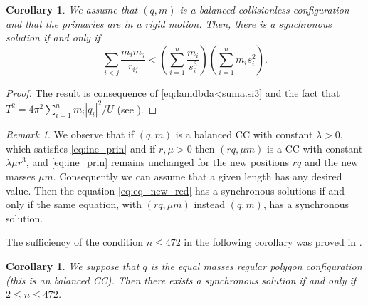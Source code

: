 \documentclass[twoside]{article}
\newtheorem{cor}[thm]{Corollary}
\theoremstyle{remark}
\newtheorem{comentario}{Remark}
\begin{document}
\begin{cor}
We assume that $(q,m)$ is a balanced collisionless configuration and that the primaries are in a rigid motion. Then, there is a synchronous solution if and only if
 \begin{equation}\label{eq:ine_prin}
 \sum_{i<j}\frac{m_im_j}{r_{ij}}<\left(\sum_{i=1}^n\frac{m_i}{s_i^3}\right)\left(\sum_{i=1}^nm_is_i^2\right).
\end{equation}
\end{cor}

\begin{proof}
The result is consequence of \eqref{eq:lamdbda<suma.si3} and the fact that $T^2=4\pi^2 \sum_{i=1}^{n}m_i|q_i|^2/U$   (see \cite[p. 109]{JaumeLlibre276}).
\end{proof}


\begin{comentario}\label{com:sincronicas}
We observe that if $(q,m)$  is a  balanced  CC  with constant $\lambda>0$, which satisfies \eqref{eq:ine_prin} and if $r,\mu>0$  then  $(rq,\mu m)$ is a CC with constant $\lambda \mu r^3$, and \eqref{eq:ine_prin} remains unchanged for the new positions $rq$ and the new masses $\mu m$. Consequently we can assume that a given length has any desired value. Then the equation \eqref{eq:eq_new_red} has a synchronous solutions if and only if the same equation, with $(rq,\mu m)$ instead $(q,m)$, has a synchronous solution.
\end{comentario}





The sufficiency of the condition $n\leq 472$ in the following corollary  was proved in \cite{li2013characterization}.

\begin{cor}\label{cor:nleq472}
We suppose that $q$ is the equal masses regular polygon configuration  (this is an balanced CC). Then there exists a synchronous solution if and only if $2\leq n\leq 472$.
\end{cor}
\end{document}
